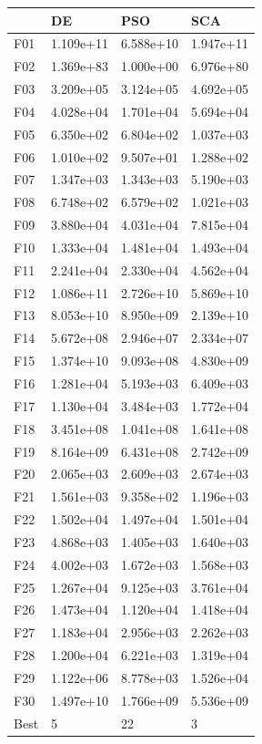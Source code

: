 \begin{tabular}{llll}
\toprule
{} &         DE &        PSO &        SCA \\
\midrule
F01  &  1.109e+11 &  6.588e+10 &  1.947e+11 \\
F02  &  1.369e+83 &  1.000e+00 &  6.976e+80 \\
F03  &  3.209e+05 &  3.124e+05 &  4.692e+05 \\
F04  &  4.028e+04 &  1.701e+04 &  5.694e+04 \\
F05  &  6.350e+02 &  6.804e+02 &  1.037e+03 \\
F06  &  1.010e+02 &  9.507e+01 &  1.288e+02 \\
F07  &  1.347e+03 &  1.343e+03 &  5.190e+03 \\
F08  &  6.748e+02 &  6.579e+02 &  1.021e+03 \\
F09  &  3.880e+04 &  4.031e+04 &  7.815e+04 \\
F10  &  1.333e+04 &  1.481e+04 &  1.493e+04 \\
F11  &  2.241e+04 &  2.330e+04 &  4.562e+04 \\
F12  &  1.086e+11 &  2.726e+10 &  5.869e+10 \\
F13  &  8.053e+10 &  8.950e+09 &  2.139e+10 \\
F14  &  5.672e+08 &  2.946e+07 &  2.334e+07 \\
F15  &  1.374e+10 &  9.093e+08 &  4.830e+09 \\
F16  &  1.281e+04 &  5.193e+03 &  6.409e+03 \\
F17  &  1.130e+04 &  3.484e+03 &  1.772e+04 \\
F18  &  3.451e+08 &  1.041e+08 &  1.641e+08 \\
F19  &  8.164e+09 &  6.431e+08 &  2.742e+09 \\
F20  &  2.065e+03 &  2.609e+03 &  2.674e+03 \\
F21  &  1.561e+03 &  9.358e+02 &  1.196e+03 \\
F22  &  1.502e+04 &  1.497e+04 &  1.501e+04 \\
F23  &  4.868e+03 &  1.405e+03 &  1.640e+03 \\
F24  &  4.002e+03 &  1.672e+03 &  1.568e+03 \\
F25  &  1.267e+04 &  9.125e+03 &  3.761e+04 \\
F26  &  1.473e+04 &  1.120e+04 &  1.418e+04 \\
F27  &  1.183e+04 &  2.956e+03 &  2.262e+03 \\
F28  &  1.200e+04 &  6.221e+03 &  1.319e+04 \\
F29  &  1.122e+06 &  8.778e+03 &  1.526e+04 \\
F30  &  1.497e+10 &  1.766e+09 &  5.536e+09 \\
Best &          5 &         22 &          3 \\
\bottomrule
\end{tabular}
